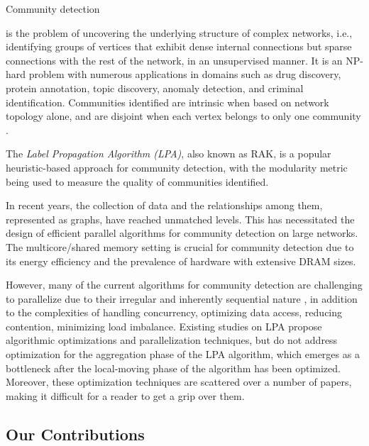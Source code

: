 Community detection is the problem of uncovering the underlying structure of complex networks, i.e., identifying groups of vertices that exhibit dense internal connections but sparse connections with the rest of the network, in an unsupervised manner. It is an NP-hard problem with numerous applications in domains such as drug discovery, protein annotation, topic discovery, anomaly detection, and criminal identification. Communities identified are intrinsic when based on network topology alone, and are disjoint when each vertex belongs to only one community \cite{com-gregory10}. The \textit{Label Propagation Algorithm (LPA)}, also known as RAK, \cite{com-blondel08} is a popular heuristic-based approach for community detection, with the modularity metric \cite{com-newman06} being used to measure the quality of communities identified.

In recent years, the collection of data and the relationships among them, represented as graphs, have reached unmatched levels. This has necessitated the design of efficient parallel algorithms for community detection on large networks. The multicore/shared memory setting is crucial for community detection due to its energy efficiency and the prevalence of hardware with extensive DRAM sizes. However, many of the current algorithms for community detection are challenging to parallelize due to their irregular and inherently sequential nature \cite{com-halappanavar17}, in addition to the complexities of handling concurrency, optimizing data access, reducing contention, minimizing load imbalance. Existing studies on LPA propose algorithmic optimizations and parallelization techniques, but do not address optimization for the aggregation phase of the LPA algorithm, which emerges as a bottleneck after the local-moving phase of the algorithm has been optimized. Moreover, these optimization techniques are scattered over a number of papers, making it difficult for a reader to get a grip over them.




\subsection{Our Contributions}

